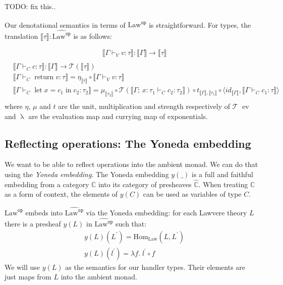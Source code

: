 \documentclass[acmsmall, screen, nonacm]{acmart}
\theoremstyle{definition}
\newcommand{\cat}{\mathbb{C}}
\newcommand{\catobj}{C}
\newcommand{\psh}{\widehat{\cat}}
\newcommand{\lawc}{\mathrm{Law}}
\newcommand{\lawcop}{\lawc^{\mathtt{op}}}
\newcommand{\pshlawcop}{\widehat{\lawcop}}
\newcommand{\yoneda}[1]{y(#1)}
\newcommand{\homset}[3]{\mathrm{Hom}_{#1}(#2, #3)}
\newcommand{\arrow}[2]{#1 \Rightarrow #2}
\newcommand{\sem}[1]{\llbracket #1 \rrbracket}
\newcommand{\mon}{\mathcal{T}}
\newcommand{\types}{\mathrel{:}}
\newcommand{\ccons}[2]{#1;\,#2}
\newcommand{\lbind}[3]{\ccons{#1}{#2\types#3}}
\newcommand{\return}[1]{\mathop{\mathrm{return}} #1}
\newcommand{\letv}[3]{\mathop{\mathrm{let}} #1 = #2 \mathop{\mathrm{in}} #3}
\newcommand{\turnv}{\mathrel{\vdash_V}}
\newcommand{\turnc}{\mathrel{\vdash_C}}
\newcommand{\evmap}{\mathop{ev}}
\newcommand{\currymap}{\mathop{\lambda}}
\newcommand{\todo}[1]{{\color{red}TODO: #1}}
\begin{document}
\todo{fix this..}

Our denotational semantics in terms of $\pshlawcop$ is
straightforward. For types, the
translation $\sem{\tau} \mathrel{:} \pshlawcop$ is as follows:

\begin{align*}
&\sem{\Gamma \turnv v \types \tau} \mathrel{:} \sem{\Gamma} \rightarrow \sem{\tau} \\
\end{align*}
\begin{align*}
&\sem{\Gamma \turnc c \types \tau} \mathrel{:} \sem{\Gamma} \rightarrow \mon(\sem{\tau}) \\
&\sem{\Gamma \turnc \return{v} \types \tau} = \eta_{\sem{\tau}} \circ \sem{\Gamma \turnv v \types \tau} \\
&\sem{\Gamma \turnc \letv{x}{c_1}{c_2} \types \tau_2} = \mu_{\sem{\tau_2}} \circ \mon(\sem{\lbind{\Gamma}{x}{\tau_1} \turnc c_2 \types \tau_2}) \circ t_{\sem{\Gamma}, \sem{\tau_1}} \circ \langle id_{\sem{\Gamma}}, \sem{\Gamma \turnc c_1 \types \tau} \rangle \\
\end{align*}
where $\eta$, $\mu$ and $t$ are the unit, multiplication and strength
respectively of $\mon$ $\evmap$
and $\currymap$ are the evaluation map and currying map of exponentials.

\subsection{Reflecting operations: The Yoneda embedding}

We want to be able to reflect operations into the ambient monad. We can
do that using the \emph{Yoneda embedding}. The Yoneda embedding
$\yoneda{\_}$ is a full and faithful embedding from a category $\cat$
into its category of presheaves $\psh$. When treating $\cat$ as a form
of context, the elements of $y(\catobj)$ can be used as variables of
type $\catobj$.

$\lawcop$ embeds into $\pshlawcop$ via the Yoneda embedding: for each
Lawvere theory $L$ there is a presheaf $\yoneda{L}$ in $\pshlawcop$ such
that:
\begin{align*}
&\yoneda{L}(L^{\prime}) = \homset{\lawc}{L}{L^{\prime}} \\
&\yoneda{L}(l^{\prime}) = \lambda f.\; l^{\prime} \circ f
\end{align*}
We will use $\yoneda{L}$ as the semantics for our handler types. Their
elements are just maps from $L$ into the ambient monad.
\end{document}
